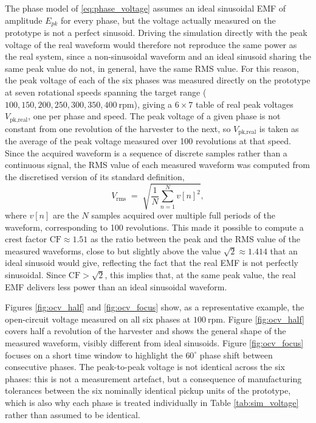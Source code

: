 The phase model of \eqref{eq:phase_voltage} assumes an ideal sinusoidal EMF of amplitude $E_{pk}$ for every phase, but the voltage actually measured on the prototype is not a perfect sinusoid. Driving the simulation directly with the peak voltage of the real waveform would therefore not reproduce the same power as the real system, since a non-sinusoidal waveform and an ideal sinusoid sharing the same peak value do not, in general, have the same RMS value. For this reason, the peak voltage of each of the six phases was measured directly on the prototype at seven rotational speeds spanning the target range ($100,150,200,250,300,350,400\ \text{rpm}$), giving a $6\times7$ table of real peak voltages $V_\text{pk,real}$, one per phase and speed. The peak voltage of a given phase is not constant from one revolution of the harvester to the next, so $V_\text{pk,real}$ is taken as the average of the peak voltage measured over 100 revolutions at that speed. Since the acquired waveform is a sequence of discrete samples rather than a continuous signal, the RMS value of each measured waveform was computed from the discretised version of its standard definition,
\begin{equation}
    V_\text{rms} \;=\; \sqrt{\frac{1}{N}\sum_{n=1}^{N} v[n]^2},
    \label{eq:rms_def}
\end{equation}
where $v[n]$ are the $N$ samples acquired over multiple full periods of the waveform, corresponding to 100 revolutions. This made it possible to compute a crest factor $\text{CF}\approx1.51$ as the ratio between the peak and the RMS value of the measured waveforms, close to but slightly above the value $\sqrt{2}\approx1.414$ that an ideal sinusoid would give, reflecting the fact that the real EMF is not perfectly sinusoidal. Since $\text{CF}>\sqrt{2}$, this implies that, at the same peak value, the real EMF delivers less power than an ideal sinusoidal waveform.

Figures \ref{fig:ocv_half} and \ref{fig:ocv_focus} show, as a representative example, the open-circuit voltage measured on all six phases at $100\ \text{rpm}$. Figure \ref{fig:ocv_half} covers half a revolution of the harvester and shows the general shape of the measured waveform, visibly different from ideal sinusoids. Figure \ref{fig:ocv_focus} focuses on a short time window to highlight the $60^\circ$ phase shift between consecutive phases. The peak-to-peak voltage is not identical across the six phases: this is not a measurement artefact, but a consequence of manufacturing tolerances between the six nominally identical pickup units of the prototype, which is also why each phase is treated individually in Table \ref{tab:sim_voltage} rather than assumed to be identical.

